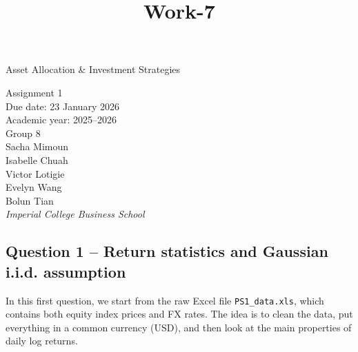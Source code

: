 \documentclass[11pt]{article}
\title{Work-7}
\begin{document}
    
    \maketitle
    
    

    
    \setcounter{secnumdepth}{0}
\renewcommand{\maketitle}{}
\title{}
\author{}
\date{}

\thispagestyle{empty}

\begin{center}
\vspace*{4cm}

{\LARGE Asset Allocation \& Investment Strategies \\[0.5cm]}

{\Large Assignment 1}\\[1cm]

Due date: 23 January 2026\\
Academic year: 2025--2026\\[1.5cm]

Group 8\\[0.3cm]
Sacha Mimoun\\
Isabelle Chuah\\
Victor Lotigie\\
Evelyn Wang\\
Bolun Tian\\[1.5cm]

\textit{Imperial College Business School}

\end{center}

\newpage
    \thispagestyle{empty}
\clearpage

\tableofcontents

\newpage

    \hypertarget{question-1-return-statistics-and-gaussian-i.i.d.-assumption}{%
\subsection{Question 1 -- Return statistics and Gaussian i.i.d.
assumption}\label{question-1-return-statistics-and-gaussian-i.i.d.-assumption}}

    In this first question, we start from the raw Excel file
\texttt{PS1\_data.xls}, which contains both equity index prices and FX
rates. The idea is to clean the data, put everything in a common
currency (USD), and then look at the main properties of daily log
returns.
\end{document}
